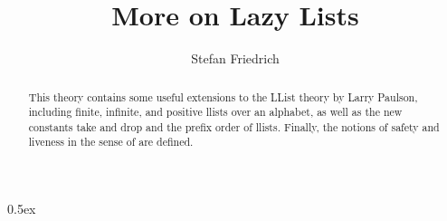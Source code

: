 \documentclass[11pt,a4paper]{article}
\begin{document}
\title{More on Lazy Lists}
\author{Stefan Friedrich}
\maketitle

\begin{abstract}
  This theory contains some useful extensions to the LList theory by
  Larry Paulson, including finite, infinite, and positive llists over
  an alphabet, as well as the new constants take and drop and the
  prefix order of llists. Finally, the notions of safety and liveness
  in the sense of \cite{alpern85:_defin_liven} are defined.
\end{abstract}

\tableofcontents

\parindent 0pt\parskip 0.5ex





\end{document}
